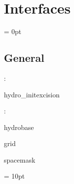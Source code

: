 
\section{Interfaces} 


\parskip = 0pt

\vspace{3mm} \subsection*{General}

: 

hydro\_initexcision
\vspace{2mm}

: 

hydrobase

grid

spacemask
\vspace{2mm}

\vspace{5mm}\parskip = 10pt 
